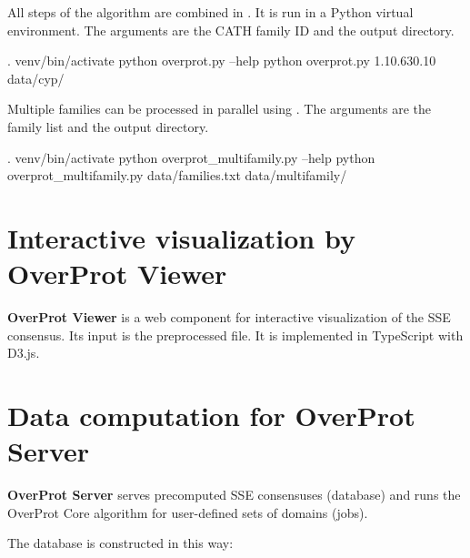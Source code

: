 \documentclass{article}
\begin{document}
All steps of the algorithm are combined in . 
It is run in a Python virtual environment. 
The arguments are the CATH family ID and the output directory.

\begin{codeblock}
  . venv/bin/activate
  python overprot.py --help
  python overprot.py 1.10.630.10 data/cyp/
\end{codeblock}

Multiple families can be processed in parallel using . 
The arguments are the family list and the output directory.

\begin{codeblock}
  . venv/bin/activate
  python overprot_multifamily.py --help
  python overprot_multifamily.py data/families.txt data/multifamily/
\end{codeblock}


\section{Interactive visualization by OverProt Viewer}

\textbf{OverProt Viewer} is a web component for interactive
visualization of the SSE consensus. Its input is the preprocessed
 file. It is implemented in TypeScript with D3.js.



\section{Data computation for OverProt Server}

\textbf{OverProt Server} serves precomputed SSE consensuses (database)
and runs the OverProt Core algorithm for user-defined sets of domains
(jobs).

The database is constructed in this way:
\end{document}
